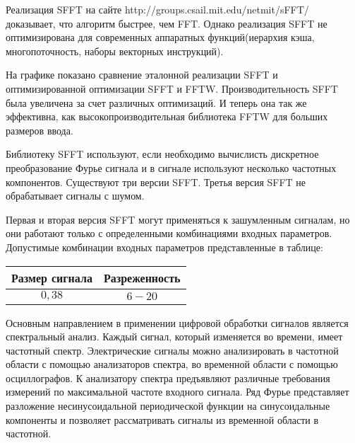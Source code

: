 Реализация SFFT на сайте http://groups.csail.mit.edu/netmit/sFFT/
доказывает, что алгоритм быстрее, чем FFT. Однако реализация SFFT не оптимизирована для современных аппаратных функций(иерархия кэша, многопоточность, наборы векторных инструкций).

На графике показано сравнение эталонной реализации SFFT и оптимизированной оптимизации SFFT и FFTW. Производительность SFFT была увеличена за счет различных оптимизаций. И теперь она так же эффективна, как высокопроизводительная библиотека FFTW для больших размеров ввода.

Библиотеку SFFT используют, если необходимо вычислисть дискретное преобразование Фурье сигнала и в сигнале используют несколько частотных компонентов. Существуют три версии SFFT. Третья версия SFFT не обрабатывает сигналы с шумом.

Первая и вторая версия SFFT могут применяться к зашумленным сигналам, но они работают только с определенными комбинациями входных параметров. Допустимые комбинации входных параметров представленные в таблице:

\begin{table}[ht]
	\caption{Допустимые комбинации входных параметров}%
	\label{tbl:test3_1}%
	\fontsize{14pt}{14pt}\selectfont
	\begin{longtable*}[c]{|c|c|} 
		\hline
		Размер сигнала & Разреженность \\
		\hline
		$0,38$ &
		$6-20$  \\
		\hline
	\end{longtable*}
\end{table}





Основным направлением в применении цифровой обработки сигналов является спектральный анализ. Каждый сигнал, который изменяется во времени, имеет частотный спектр. Электрические сигналы можно 
анализировать в частотной области с помощью анализаторов спектра, во временной области с помощью осциллографов. К анализатору спектра предъявляют различные требования измерений по максимальной частоте входного сигнала. Ряд Фурье представляет разложение несинусоидальной периодической функции на синусоидальные компоненты и позволяет рассматривать сигналы из временной области в частотной.

